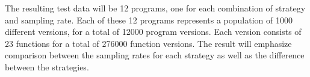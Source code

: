 The resulting test data will be 12 programs, one for each combination of strategy and
sampling rate. Each of these 12 programs represents a population of 1000 different versions,
for a total of 12000 program versions. Each version consists of 23 functions for a total
of 276000 function versions. The result will emphasize comparison between the sampling
rates for each strategy as well as the difference between the strategies.
